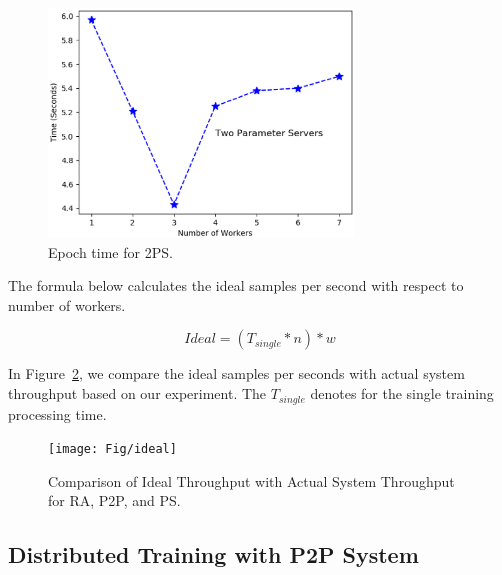 \documentclass[conference]{IEEEtran}
\begin{document}
\begin{figure}[htb]
  \includegraphics[width=3.2in]{Fig/2pslatency}
  \caption{Epoch time for 2PS.}
  \label{fig:2pslatency}
\end{figure}


The formula below calculates the ideal samples per second with respect to number of workers. 

\begin{equation}
Ideal = (T_{single} * n) * w
\end{equation}

In Figure~\ref{fig:ideal}, we compare the ideal samples per seconds with actual system throughput based on our experiment. The $T_{single}$ denotes for the single training processing time. 

\begin{figure}[htb]
  \texttt{[image: Fig/ideal]}
  \caption{Comparison of Ideal Throughput with Actual System Throughput for RA, P2P, and PS.}
  \label{fig:ideal}
\end{figure}


\subsection{Distributed Training with P2P System}
\label{sec:permodelp2p}
\end{document}
